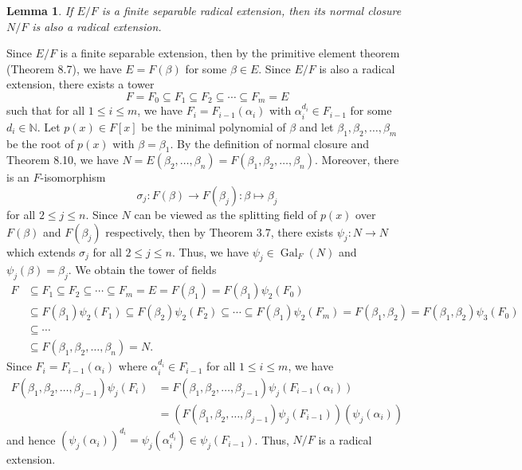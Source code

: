 \documentclass[10pt]{article}
\makeatletter
\newcommand{\N}{\mathbb{N}}
\DeclareMathOperator{\Gal}{Gal}
\theoremstyle{newstyle}
\newtheorem{lemma}[thm]{Lemma}
\newenvironment{pf}[1][\proofname]{\par
  \pushQED{\qed}%
  \normalfont \topsep0\p@\relax
  \trivlist
  \item[\hskip\labelsep\scshape
  #1\@addpunct{.}]\ignorespaces
}{%
  \popQED\endtrivlist\@endpefalse
}
\makeatother
\begin{document}
\begin{lemma}
If $E/F$ is a finite separable radical extension, then its normal closure $N/F$ is also a radical 
extension.
\end{lemma}
\begin{pf}
Since $E/F$ is a finite separable extension, then by the primitive element theorem (Theorem 8.7), 
we have $E = F(\beta)$ for some $\beta \in E$. Since $E/F$ is also a radical extension, there 
exists a tower 
\[ F = F_0 \subseteq F_1 \subseteq F_2 \subseteq \cdots \subseteq F_m = E \]
such that for all $1 \leq i \leq m$, we have $F_i = F_{i-1}(\alpha_i)$ with 
$\alpha_i^{d_i} \in F_{i-1}$ for some $d_i \in \N$. Let $p(x) \in F[x]$ be the minimal polynomial 
of $\beta$ and let $\beta_1, \beta_2, \dots, \beta_m$ be the root of $p(x)$ with 
$\beta = \beta_1$. By the definition of normal closure and Theorem 8.10, we have 
$N = E(\beta_2, \dots, \beta_n) = F(\beta_1, \beta_2, \dots, \beta_n)$. Moreover, there is an 
$F$-isomorphism 
\[ \sigma_j : F(\beta) \to F(\beta_j) : \beta \mapsto \beta_j \]
for all $2 \leq j \leq n$. Since $N$ can be viewed as the splitting field of $p(x)$ over 
$F(\beta)$ and $F(\beta_j)$ respectively, then by Theorem 3.7, there exists 
$\psi_j : N \to N$ which extends $\sigma_j$ for all $2 \leq j \leq n$. Thus, we have 
$\psi_j \in \Gal_F(N)$ and $\psi_j(\beta) = \beta_j$. We obtain the tower of fields 
\begin{align*}
    F
    &\subseteq F_1 \subseteq F_2 \subseteq \cdots \subseteq F_m = E = F(\beta_1) = F(\beta_1)\psi_2(F_0) \\
    &\subseteq F(\beta_1)\psi_2(F_1) \subseteq F(\beta_2)\psi_2(F_2) \subseteq \cdots 
    \subseteq F(\beta_1)\psi_2(F_m) = F(\beta_1, \beta_2) = F(\beta_1, \beta_2)\psi_3(F_0) \\ 
    &\subseteq \cdots \\
    &\subseteq F(\beta_1, \beta_2, \dots, \beta_n) = N. 
\end{align*}
Since $F_i = F_{i-1}(\alpha_i)$ where $\alpha_i^{d_i} \in F_{i-1}$ for all $1 \leq i \leq m$, we have 
\begin{align*}
    F(\beta_1, \beta_2, \dots, \beta_{j-1}) \psi_j(F_i) 
    &= F(\beta_1, \beta_2, \dots, \beta_{j-1}) \psi_j(F_{i-1}(\alpha_i)) \\
    &= (F(\beta_1, \beta_2, \dots, \beta_{j-1}) \psi_j(F_{i-1})) (\psi_j(\alpha_i)) 
\end{align*}
and hence $(\psi_j(\alpha_i))^{d_i} = \psi_j(\alpha_i^{d_i}) \in \psi_j(F_{i-1})$. Thus, 
$N/F$ is a radical extension.
\end{pf}
\end{document}

